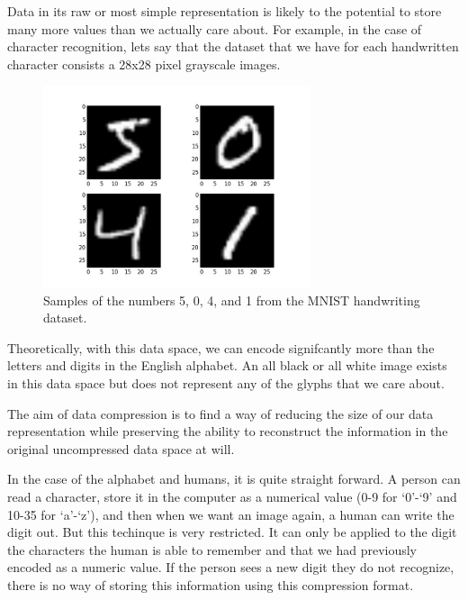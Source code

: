 \documentclass[12pt]{report}
\begin{document}
            Data in its raw or most simple representation is likely to the potential to store many more values than we actually care about. For example, in the case of character recognition, lets say that the dataset that we have for each handwritten character consists a 28x28 pixel grayscale images.

            \begin{figure}[H]
                \centering
                \includegraphics[width=0.7\textwidth]{mnist-handwriting-dataset.jpg}
                \caption{\label{fig:mnist-handwriting-dataset} Samples of the numbers 5, 0, 4, and 1 from the MNIST handwriting dataset.}
            \end{figure}

            Theoretically, with this data space, we can encode signifcantly more than the letters and digits in the English alphabet. An all black or all white image exists in this data space but does not represent any of the glyphs that we care about.

            The aim of data compression is to find a way of reducing the size of our data representation while preserving the ability to reconstruct the information in the original uncompressed data space at will.

            In the case of the alphabet and humans, it is quite straight forward. A person can read a character, store it in the computer as a numerical value (0-9 for `0'-`9' and 10-35 for `a'-`z'), and then when we want an image again, a human can write the digit out. But this techinque is very restricted. It can only be applied to the digit the characters the human is able to remember and that we had previously encoded as a numeric value. If the person sees a new digit they do not recognize, there is no way of storing this information using this compression format.
\end{document}

